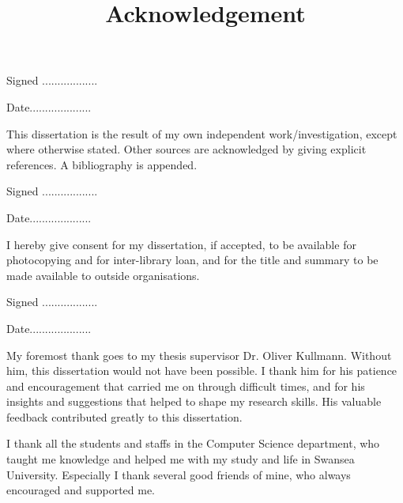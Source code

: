 \documentclass[a4paper,12pt]{report}
\begin{document}
\begin{flushleft}Signed ..................\end{flushleft} 
\begin{flushright}Date....................\end{flushright}                                                                                                                                              

This dissertation is the result of my own independent work/investigation, except where otherwise stated. Other sources are acknowledged by giving explicit references. A bibliography is appended.

\begin{flushleft}Signed ..................\end{flushleft} 
\begin{flushright}Date....................\end{flushright}                                                                                                                                              

I hereby give consent for my dissertation, if accepted, to be available for photocopying and for inter-library loan, and for the title and summary to be made available to outside organisations.

\begin{flushleft}Signed ..................\end{flushleft} 
\begin{flushright}Date....................\end{flushright}                                                                                                                                              
 \clearpage
\begin{center}
\title {Acknowledgement}
\end{center}
My foremost thank goes to my thesis supervisor Dr. Oliver Kullmann. Without him, this dissertation would not have been possible. I thank him for his patience and encouragement that carried me on through difficult times, and for his insights and suggestions that helped to shape my research skills. His valuable feedback contributed greatly to this dissertation.

I thank all the students and staffs in the Computer Science department, who taught me knowledge and helped me with my study and life in Swansea University. Especially I thank several good friends of mine, who always encouraged and supported me.
\end{document}
